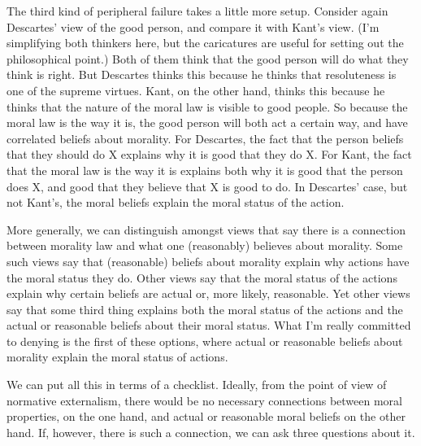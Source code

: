 The third kind of peripheral failure takes a little more setup. Consider again Descartes' view of the good person, and compare it with Kant's view. (I'm simplifying both thinkers here, but the caricatures are useful for setting out the philosophical point.) Both of them think that the good person will do what they think is right. But Descartes thinks this because he thinks that resoluteness is one of the supreme virtues. Kant, on the other hand, thinks this because he thinks that the nature of the moral law is visible to good people. So because the moral law is the way it is, the good person will both act a certain way, and have correlated beliefs about morality. For Descartes, the fact that the person beliefs that they should do X explains why it is good that they do X. For Kant, the fact that the moral law is the way it is explains both why it is good that the person does X, and good that they believe that X is good to do. In Descartes' case, but not Kant's, the moral beliefs explain the moral status of the action.

More generally, we can distinguish amongst views that say there is a connection between morality law and what one (reasonably) believes about morality. Some such views say that (reasonable) beliefs about morality explain why actions have the moral status they do. Other views say that the moral status of the actions explain why certain beliefs are actual or, more likely, reasonable. Yet other views say that some third thing explains both the moral status of the actions and the actual or reasonable beliefs about their moral status. What I'm really committed to denying is the first of these options, where actual or reasonable beliefs about morality explain the moral status of actions.

We can put all this in terms of a checklist. Ideally, from the point of view of normative externalism, there would be no necessary connections between moral properties, on the one hand, and actual or reasonable moral beliefs on the other hand. If, however, there is such a connection, we can ask three questions about it.

